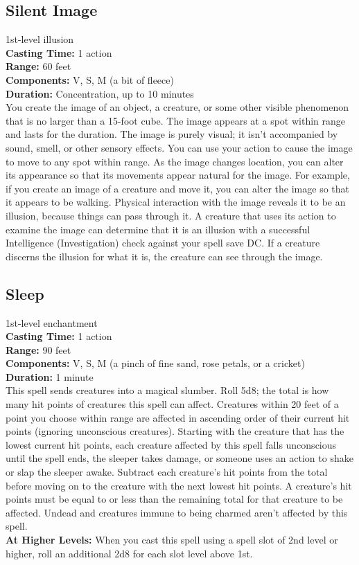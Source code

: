 \documentclass[11pt, A4paper, english]{article}
\begin{document}
		\subsection{Silent Image}
1st-level illusion \\
\textbf{Casting Time:} 1 action \\
\textbf{Range:} 60 feet \\
\textbf{Components:} V, S, M (a bit of fleece) \\
\textbf{Duration:} Concentration, up to  10 minutes \\
You create the image of an object, a creature, or some other visible phenomenon that is no larger than a 15-foot cube. The image appears at a spot within range and lasts for the duration. The image is purely visual; it isn't accompanied by sound, smell, or other sensory effects. You can use your action to cause the image to move to any spot within range. As the image changes location, you can alter its appearance so that its movements appear natural for the image. For example, if you create an image of a creature and move it, you can alter the image so that it appears to be walking. Physical interaction with the image reveals it to be an illusion, because things can pass through it. A creature that uses its action to examine the image can determine that it is an illusion with a successful Intelligence (Investigation) check against your spell save DC. If a creature discerns the illusion for what it is, the creature can see through the image.

		\subsection{Sleep}
1st-level enchantment \\
\textbf{Casting Time:} 1 action \\
\textbf{Range:} 90 feet \\
\textbf{Components:} V, S, M (a pinch of fine sand, rose petals, or a cricket) \\
\textbf{Duration:} 1 minute \\
This spell sends creatures into a magical slumber. Roll 5d8; the total is how many hit points of creatures this spell can affect. Creatures within 20 feet of a point you choose within range are affected in ascending order of their current hit points (ignoring unconscious creatures). Starting with the creature that has the lowest current hit points, each creature affected by this spell falls unconscious until the spell ends, the sleeper takes damage, or someone uses an action to shake or slap the sleeper awake. Subtract each creature’s hit points from the total before moving on to the creature with the next lowest hit points. A creature’s hit points must be equal to or less than the remaining total for that creature to be affected. Undead and creatures immune to being charmed aren’t affected by this spell. \\
\textbf{At Higher Levels:} When you cast this spell using a spell slot of 2nd level or higher, roll an additional 2d8 for each slot level above 1st.
\end{document}
